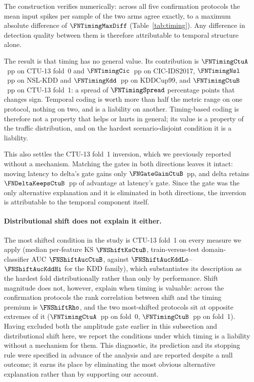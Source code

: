 The construction verifies numerically: across all five confirmation protocols
the mean input spikes per sample of the two arms agree exactly, to a maximum
absolute difference of $\FNTimingMaxDiff$ (Table~\ref{tab:timing}). Any
difference in detection quality between them is therefore attributable to
temporal structure alone.



The result is that timing has no general value. Its contribution is
$\FNTimingCtuA$~pp on CTU-13 fold~0 and $\FNTimingCic$~pp on CIC-IDS2017,
$\FNTimingNsl$~pp on NSL-KDD and $\FNTimingKdd$~pp on KDDCup99, and
$\FNTimingCtuB$~pp on CTU-13 fold~1: a spread of $\FNTimingSpread$
percentage points that changes sign. Temporal coding is worth more than half the
metric range on one protocol, nothing on two, and is a liability on another.
Timing-based coding is therefore not a property that helps or hurts in general;
its value is a property of the traffic distribution, and on the hardest
scenario-disjoint condition it is a liability.

This also settles the CTU-13 fold~1 inversion, which we previously reported
without a mechanism. Matching the gates in both directions leaves it intact:
moving latency to delta's gate gains only $\FNGateGainCtuB$~pp, and delta
retains $\FNDeltaKeepsCtuB$~pp of advantage at latency's gate. Since the gate
was the only alternative explanation and it is eliminated in both directions,
the inversion is attributable to the temporal component itself.

\paragraph{Distributional shift does not explain it either.}
The most shifted condition in the study is CTU-13 fold~1 on every measure we
apply (median per-feature KS $\FNShiftKsCtuB$, train-versus-test
domain-classifier AUC $\FNShiftAucCtuB$, against $\FNShiftAucKddLo$--%
$\FNShiftAucKddHi$ for the KDD family), which substantiates its description as
the hardest fold distributionally rather than only by performance. Shift
magnitude does not, however, explain when timing is valuable: across the
\FNShiftNProto{} confirmation protocols the rank correlation between shift and
the timing premium is $\FNShiftRho$, and the two most-shifted protocols sit at
opposite extremes of it ($\FNTimingCtuA$~pp on fold~0, $\FNTimingCtuB$~pp on
fold~1). Having excluded both the amplitude gate earlier in this subsection and
distributional shift here, we report the conditions under which timing is a
liability without a mechanism for them. This diagnostic, its prediction and its
stopping rule were specified in
advance of the analysis and are reported despite a null outcome; it earns its
place by eliminating the most obvious alternative explanation rather than by
supporting our account.


